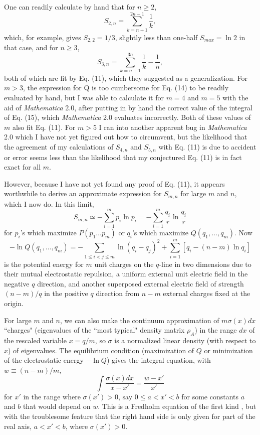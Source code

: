 One can readily calculate by hand that for $n\geq 2$,
	\begin{equation}
	S_{2,n}=\sum_{k=n+1}^{2n-1}\frac{1}{k},
	\end{equation}
which, for example, gives $S_{2,2}=1/3$, slightly less than one-half
$S_{max}=\ln 2$ in that case, and for $n\geq 3$,
	\begin{equation}
	S_{3,n}=\sum_{k=n+1}^{3n}\frac{1}{k} - \frac{1}{n},
	\end{equation}
both of which are fit by Eq. (11), which they suggested as a
generalization.
For $m>3$, the expression for Q is too cumbersome for Eq. (14) to be
readily
evaluated by hand, but I was able to calculate it for $m=4$ and $m=5$
with the
aid of {\it Mathematica} 2.0, after putting in by hand the correct
value of the
integral of Eq. (15), which {\it Mathematica} 2.0 evaluates
incorrectly.  Both
of these values of $m$ also fit Eq. (11).  For $m>5$ I ran into
another
apparent bug in {\it Mathematica} 2.0 which I have not yet figured
out how to
circumvent, but the likelihood that the agreement of my calculations
of
$S_{4,n}$ and $S_{5,n}$ with Eq. (11) is due to accident or error
seems less
than the likelihood that my conjectured Eq. (11) is in fact exact for
all $m$.

However, because I have not yet found any proof of Eq. (11), it
appears
worthwhile to derive an approximate expression for $S_{m,n}$ for
large $m$ and
$n$, which I now do.  In this limit,
	\begin{equation}
	S_{m,n}\simeq -\sum_{i=1}^{m}p_i \ln p_i =
	-\sum_{i=1}^{m}\frac{q_i}{r}\ln \frac{q_i}{r}
	\end{equation}
for $p_i$'s which maximize $P(p_1\ldots p_m)$ or $q_i$'s which
maximize
$Q(q_1,\ldots,q_m)$.  Now
	\begin{equation}
	-\ln Q(q_1,\ldots,q_m)=-\sum_{1\leq i<j\leq m} \ln
(q_i-q_j)^2+
	\sum_{i=1}^{m}[ q_i -(n-m)\ln q_i]
	\end{equation}
is the potential energy for $m$ unit charges on the $q$-line in two
dimensions
due to their mutual electrostatic repulsion, a uniform external unit
electric
field in the negative $q$ direction, and another superposed external
electric
field of strength $(n-m)/q$ in the positive $q$ direction from $n-m$
external
charges fixed at the origin.

For large $m$ and $n$, we can also make the continuum approximation
of
$m\sigma(x)dx$ ``charges" (eigenvalues of the ``most typical" density
matrix
$\rho_A$) in the range $dx$ of the rescaled variable $x=q/m$, so
$\sigma$ is a
normalized linear density (with respect to $x$) of eigenvalues.  The
equilibrium condition (maximization of $Q$ or minimization of the
electrostatic
energy $-\ln Q$) gives the integral equation, with $w\equiv (n-m)/m$,
	\begin{equation}
        \int \frac{\sigma(x)dx}{x-x'} = \frac{w-x'}{x'}
	\end{equation}
for $x'$ in the range where $\sigma(x')>0$, say $0\leq a<x'<b$ for
some
constants $a$ and $b$ that would depend on $w$.  This is a Fredholm
equation of
the first kind \cite{MW}, but with the troublesome feature that the
right hand
side is only given for part of the real axis, $a<x'<b$, where
$\sigma(x')>0$.

